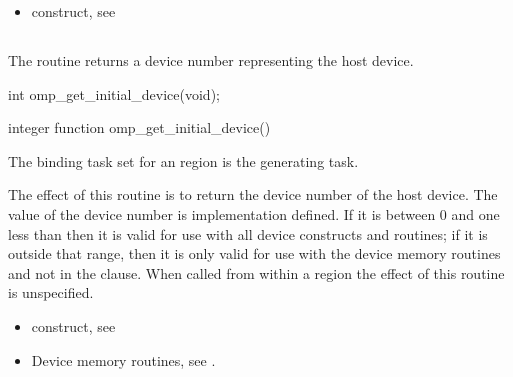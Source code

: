 \crossreferences
\begin{itemize}
\item {} construct, see 
\end{itemize}





\subsection{}
\label{subsec:omp_get_initial_device}
\summary
The  routine returns a device number representing
the host device.

\begin{samepage}
\format
\begin{ccppspecific}
\begin{boxedcode}
int omp\_get\_initial\_device(void);
\end{boxedcode}
\end{ccppspecific}
\end{samepage}

\begin{fortranspecific}
\begin{boxedcode}
integer function omp\_get\_initial\_device()
\end{boxedcode}
\end{fortranspecific}

\binding
The binding task set for an  region is the generating task.

\effect
The effect of this routine is to return the device number of the host device.
The value of the device number is implementation defined. If it is between 0 
and one less than  then it is valid for use 
with all device constructs and routines; if it is outside that range, then 
it is only valid for use with the device memory routines and not in the 
 clause. When called from within a  region 
the effect of this routine is unspecified.

\crossreferences
\begin{itemize}
\item {} construct, see 

\item Device memory routines, see .
\end{itemize}




